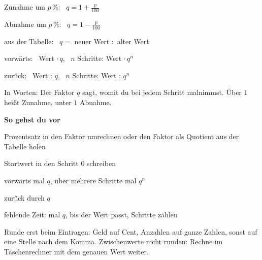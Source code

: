 \documentclass[11pt]{article}
\newcommand{\nr}[1]{\makebox[7mm][l]{\textbf{#1}}}
\begin{document}
\begin{tcolorbox}[colback=mbkasten,colframe=mbgrau,boxrule=0.5pt,arc=1mm,left=3mm,right=3mm,top=2mm,bottom=2mm,title={\bfseries Formel auf einen Blick},coltitle=black,colbacktitle=black!10]
\begin{minipage}[t]{0.58\linewidth}\vspace{0pt}
{\Large \large Zunahme um $p\,\%$: \ $q = 1 + \frac{p}{100}$ \par Abnahme um $p\,\%$: \ $q = 1 - \frac{p}{100}$ \par aus der Tabelle: \ $q =$ neuer Wert $:$ alter Wert \par vorwärts: \ Wert $\cdot\, q$, \ $n$ Schritte: Wert $\cdot\, q^n$ \par zurück: \ Wert $:\, q$, \ $n$ Schritte: Wert $:\, q^n$}\par\medskip
In Worten: Der Faktor $q$ sagt, womit du bei jedem Schritt malnimmst. Über $1$ heißt Zunahme, unter $1$ Abnahme.\par\medskip
\textbf{So gehst du vor}\par
\nr{1}Prozentsatz in den Faktor umrechnen oder den Faktor als Quotient aus der Tabelle holen\par
\nr{2}Startwert in den Schritt $0$ schreiben\par
\nr{3}vorwärts mal $q$, über mehrere Schritte mal $q^n$\par
\nr{4}zurück durch $q$\par
\nr{5}fehlende Zeit: mal $q$, bis der Wert passt, Schritte zählen\par
\medskip
{\small Runde erst beim Eintragen: Geld auf Cent, Anzahlen auf ganze Zahlen, sonst auf eine Stelle nach dem Komma. Zwischenwerte nicht runden: Rechne im Taschenrechner mit dem genauen Wert weiter.}
\end{minipage}\hfill
\begin{minipage}[t]{0.38\linewidth}\vspace{2mm}\centering
{}
\end{minipage}
\end{tcolorbox}
\end{document}
